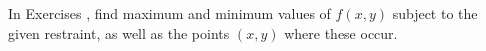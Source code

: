 {\noindent In Exercises} 
{,  find maximum and minimum values of $f(x,y)$ subject to the given restraint, as well as the points $(x,y)$ where these occur.
}
